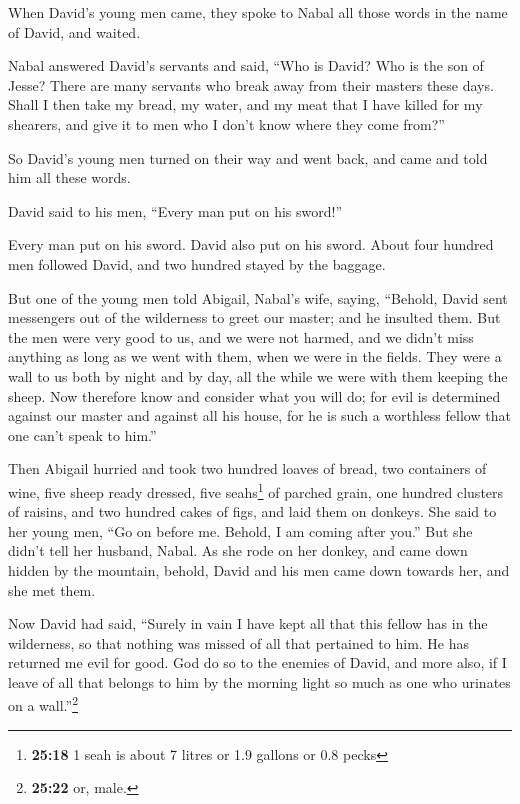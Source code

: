  When David's young men came, they spoke to Nabal all
those words in the name of David, and waited.

 Nabal answered David's servants and said, ``Who is
David? Who is the son of Jesse? There are many servants who break away
from their masters these days.  Shall I then take my
bread, my water, and my meat that I have killed for my shearers, and
give it to men who I don't know where they come from?''

 So David's young men turned on their way and went back,
and came and told him all these words.

 David said to his men, ``Every man put on his sword!''

Every man put on his sword. David also put on his sword. About four
hundred men followed David, and two hundred stayed by the baggage.

 But one of the young men told Abigail, Nabal's wife,
saying, ``Behold, David sent messengers out of the wilderness to greet
our master; and he insulted them.  But the men were very
good to us, and we were not harmed, and we didn't miss anything as long
as we went with them, when we were in the fields.  They
were a wall to us both by night and by day, all the while we were with
them keeping the sheep.  Now therefore know and consider
what you will do; for evil is determined against our master and against
all his house, for he is such a worthless fellow that one can't speak to
him.''

 Then Abigail hurried and took two hundred loaves of
bread, two containers of wine, five sheep ready dressed, five
seahs\footnote{\textbf{25:18} 1 seah is about 7 litres or 1.9 gallons or
  0.8 pecks} of parched grain, one hundred clusters of raisins, and two
hundred cakes of figs, and laid them on donkeys.  She
said to her young men, ``Go on before me. Behold, I am coming after
you.'' But she didn't tell her husband, Nabal.  As she
rode on her donkey, and came down hidden by the mountain, behold, David
and his men came down towards her, and she met them.

 Now David had said, ``Surely in vain I have kept all
that this fellow has in the wilderness, so that nothing was missed of
all that pertained to him. He has returned me evil for good.
 God do so to the enemies of David, and more also, if I
leave of all that belongs to him by the morning light so much as one who
urinates on a wall.''\footnote{\textbf{25:22} or, male.}

